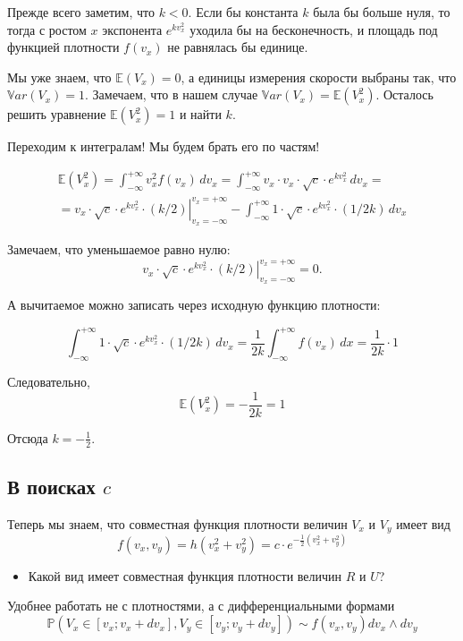\documentclass[11pt,russian,]{article}
\providecommand{\tightlist}{%
  \setlength{\itemsep}{0pt}\setlength{\parskip}{0pt}}
\newcommand{\E}{\mathbb{E}}
\newcommand{\Var}{\mathbb{V}ar}
\renewcommand{\P}{\mathbb{P}}
\begin{document}
Прежде всего заметим, что \(k<0\). Если бы константа \(k\) была бы
больше нуля, то тогда с ростом \(x\) экспонента \(e^{kv_x^2}\) уходила
бы на бесконечность, и площадь под функцией плотности \(f(v_x)\) не
равнялась бы единице.

Мы уже знаем, что \(\E(V_x)=0\), а единицы измерения скорости выбраны
так, что \(\Var(V_x)=1\). Замечаем, что в нашем случае
\(\Var(V_x)=\E(V_x^2)\). Осталось решить уравнение \(\E(V_x^2)=1\) и
найти \(k\).

Переходим к интегралам! Мы будем брать его по частям!

\begin{multline}
\E(V_x^2)=\int_{-\infty}^{+\infty} v_x^2 f(v_x) \, dv_x = 
  \int_{-\infty}^{+\infty} v_x \cdot v_x \cdot \sqrt{c} \cdot e^{kv_x^2} \, dv_x =\\
=\left. v_x \cdot \sqrt{c} \cdot e^{kv_x^2} \cdot (k/2) \right\rvert_{v_x = -\infty}^{v_x=+\infty} - \int_{-\infty}^{+\infty} 1 \cdot \sqrt{c} \cdot e^{kv_x^2} \cdot (1/2k) \, dv_x
\end{multline}

Замечаем, что уменьшаемое равно нулю: \[
\left. v_x \cdot \sqrt{c} \cdot e^{kv_x^2} \cdot (k/2) \right\rvert_{v_x = -\infty}^{v_x=+\infty} = 0.
\]

А вычитаемое можно записать через исходную функцию плотности:

\[
\int_{-\infty}^{+\infty} 1 \cdot \sqrt{c} \cdot e^{kv_x^2} \cdot (1/2k) \, dv_x = \frac{1}{2k} \int_{-\infty}^{+\infty}f(v_x) \, dx = \frac{1}{2k} \cdot 1
\]

Следовательно, \[
\E(V_x^2)= -\frac{1}{2k} = 1
\]

Отсюда \(k=-\frac{1}{2}\).

\subsection{\texorpdfstring{В поисках \(c\)}{В поисках c}}\label{--c}

Теперь мы знаем, что совместная функция плотности величин \(V_x\) и
\(V_y\) имеет вид \[
f(v_x, v_y) = h(v_x^2 + v_y^2) = c \cdot e^{-\frac{1}{2}(v_x^2 + v_y^2)} 
\]

\begin{itemize}
\tightlist
\item
  Какой вид имеет совместная функция плотности величин \(R\) и \(U\)?
\end{itemize}

Удобнее работать не с плотностями, а с дифференциальными формами \[
\P(V_x \in [v_x;v_x + dv_x], V_y \in [v_y;v_y + dv_y]) \sim f(v_x, v_y) dv_x \wedge dv_y
\]
\end{document}
